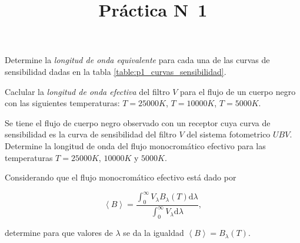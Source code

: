 \documentclass[12pt,a4paper]{practice}
\begin{document}
    \title{Práctica N\textdegree\ 1}
    \maketitle

    \begin{problem}\label{prob:1}
        Determine la \emph{longitud de onda equivalente} para cada una de las curvas de sensibilidad dadas en la tabla \ref{table:p1_curvas_sensibilidad}.
    \end{problem}

    \begin{problem}\label{prob:2}
        Caclular la \emph{longitud de onda efectiva} del filtro $V$ para el flujo de un cuerpo negro con las siguientes temperaturas: $T = 25000 K$, $T = 10000 K$, $T = 5000 K$.
    \end{problem}

    \begin{problem}\label{prob:3}
        Se tiene el flujo de cuerpo negro observado con un receptor cuya curva de sensibilidad es la curva de sensibilidad del filtro $V$ del sistema fotometrico $UBV$. Determine la longitud de onda del flujo monocromático efectivo para las temperaturas $T = 25000 K$, $10000 K$ y $5000 K$.

        \begin{recommendation}
            Considerando que el flujo monocromático efectivo está dado por

                $$\left\langle B\right\rangle = \frac{\displaystyle{\int_{0}^{\infty} V_{\lambda} B_{\lambda} \left(T\right) \mathrm{d}\lambda}}{\displaystyle{\int_{0}^{\infty} V_{\lambda} \mathrm{d}\lambda}},$$

            determine para que valores de $\lambda$ se da la igualdad $\left\langle B\right\rangle = B_{\lambda} \left(T\right)$.
        \end{recommendation}
    \end{problem}
\end{document}
